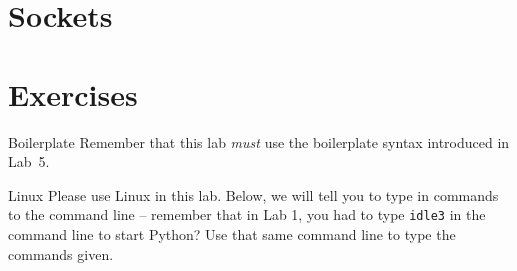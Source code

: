 \documentclass[11pt]{cselabheader}
\begin{document}
\section{Sockets}
\label{sec:sock}

\pagebreak

\section{Exercises}
\label{sec:ex}

\begin{warningbox}{Boilerplate}
  Remember that this lab \emph{must} use the
  boilerplate syntax introduced in Lab~5.
\end{warningbox}

\begin{warningbox}{Linux}
  Please use Linux in this lab. Below, we will tell you to type in commands to
  the command line -- remember that in Lab 1, you had to type \texttt{idle3} in
  the command line to start Python? Use that same command line to type the
  commands given.
\end{warningbox}
\end{document}
